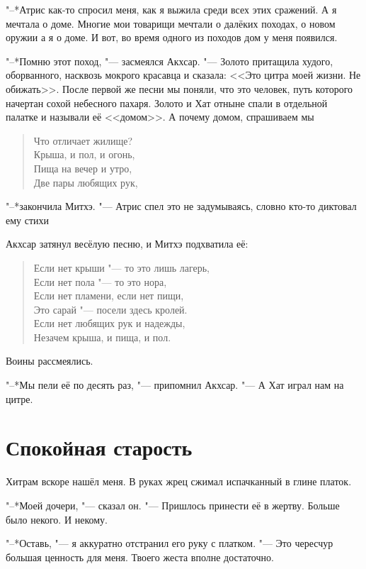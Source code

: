 \documentclass[a4paper,10pt]{book}
\newcommand{\ldotst}{\so{...}\xspace}
\newcommand{\ldotsq}{\so{?\hbox{\hspace{-.212em}}..}\xspace}
\begin{document}
"--*Атрис как-то спросил меня, как я выжила среди всех этих сражений. А я 
мечтала о доме. Многие мои товарищи мечтали о далёких походах, о новом 
оружии\ldotst а я о доме. И вот, во время одного из походов дом у меня появился.

"--*Помню этот поход, "--- засмеялся Акхсар. "--- Золото притащила худого, 
оборванного, насквозь мокрого красавца и сказала: <<Это цитра моей жизни. Не 
обижать>>. После первой же песни мы поняли, что это человек, путь которого 
начертан сохой небесного пахаря. Золото и Хат отныне спали в отдельной палатке 
и называли её <<домом>>. А почему домом, спрашиваем мы\ldotsq

\begin{verse}
Что отличает жилище?\\
Крыша, и пол, и огонь,\\
Пища на вечер и утро,\\
Две пары любящих рук,\\ 
\end{verse}

"--*закончила Митхэ. "--- Атрис спел это не задумываясь, словно кто-то диктовал 
ему стихи\ldotst

Акхсар затянул весёлую песню, и Митхэ подхватила её:

\begin{verse}
Если нет крыши "--- то это лишь лагерь,\\
Если нет пола "--- то это нора,\\
Если нет пламени, если нет пищи,\\
Это сарай "--- посели здесь кролей.\\
Если нет любящих рук и надежды,\\
Незачем крыша, и пища, и пол.\\
\end{verse}

Воины рассмеялись.

"--*Мы пели её по десять раз, "--- припомнил Акхсар. "--- А Хат играл нам на 
цитре.

\section{Спокойная старость}

Хитрам вскоре нашёл меня. В руках жрец сжимал испачканный в глине платок.

"--*Моей дочери, "--- сказал он. "--- Пришлось принести её в жертву. Больше 
было 
некого. И некому.

"--*Оставь, "--- я аккуратно отстранил его руку с платком. "--- Это чересчур 
большая ценность для меня. Твоего жеста вполне достаточно.
\end{document}
